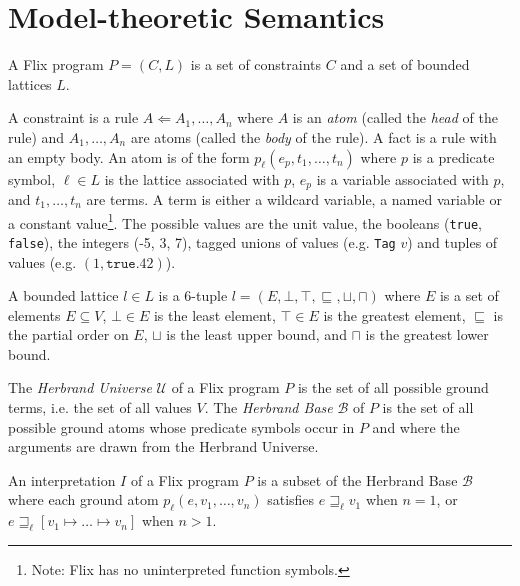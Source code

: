 \documentclass[10pt,twocolumn]{article}
\begin{document}
\section{Model-theoretic Semantics}

A Flix program $P = (C, L)$ is a set of constraints $C$ and a set of bounded lattices $L$.

A constraint is a rule $A \Leftarrow A_1, \dots, A_n$ 
where $A$ is an \emph{atom} (called the \emph{head} of the rule) 
and $A_1, \dots, A_n$ are atoms (called the \emph{body} of the rule).
A fact is a rule with an empty body.
An atom is of the form $p_\ell(e_p, t_1, \dots, t_n)$ where 
$p$ is a predicate symbol,
$\ell \in L$ is the lattice associated with $p$,
$e_p$ is a variable associated with $p$, and 
$t_1, \dots, t_n$ are terms. 
A term is either a wildcard variable, a named variable or a constant value\footnote{Note: Flix has no uninterpreted function symbols.}. 
The possible values are the unit value, the booleans (\texttt{true}, \texttt{false}),
the integers (-5, 3, 7), tagged unions of values (e.g. \texttt{Tag} $v$) and 
tuples of values (e.g. $(1, \texttt{true}. 42)$).

A bounded lattice $l \in L$ is a 6-tuple $l = (E, \bot, \top, \sqsubseteq, \sqcup, \sqcap)$ where 
$E$ is a set of elements $E \subseteq V$,
$\bot \in E$ is the least element,
$\top \in E$ is the greatest element,
$\sqsubseteq$ is the partial order on $E$,
$\sqcup$ is the least upper bound, and
$\sqcap$ is the greatest lower bound.

The \emph{Herbrand Universe} $\mathcal{U}$ of a Flix program $P$ is the set of 
all possible ground terms, i.e. the set of all values $V$.
The \emph{Herbrand Base} $\mathcal{B}$ of $P$ is the set of all possible ground atoms whose
predicate symbols occur in $P$ and where the arguments are drawn from the Herbrand Universe.


An interpretation $I$ of a Flix program $P$ is a subset of the Herbrand Base $\mathcal{B}$ where 
each ground atom $p_\ell(e, v_1, \dots, v_n)$ satisfies 
$e \sqsupseteq_\ell v_1$ when $n = 1$, or 
$e \sqsupseteq_\ell [v_1 \mapsto \dots \mapsto v_n]$ when $n > 1$.
\end{document}

